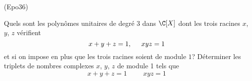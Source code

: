 \begin{tiny}(Epo36)\end{tiny} Quels sont les polynômes unitaires de degré $3$ dans $\C[X]$ dont les trois racines $x$, $y$, $z$ vérifient
\begin{displaymath}
 x+y+z=1,\hspace{0.5cm} xyz =1
\end{displaymath}
et si on impose en plus que les trois racines soient de module $1$? Déterminer les triplets de nombres complexes $x$, $y$, $z$ de module 1 tels que
\begin{displaymath}
 x+y+z=1 \hspace{1cm} xyz=1
\end{displaymath}

